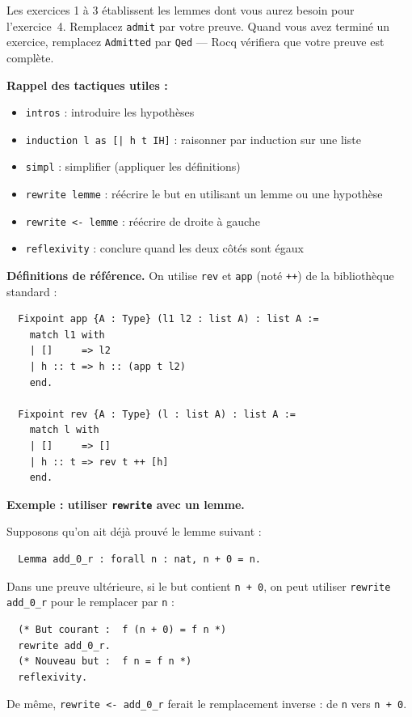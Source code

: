 \documentclass[11pt,a4paper]{article}
\newenvironment{rappel}{
\begin{mdframed}[style=rappelstyle]}{
\end{mdframed}}
\newcommand{\cq}[1]{\texttt{#1}}
\begin{document}
Les exercices 1 à 3 établissent les lemmes dont vous aurez besoin pour
l'exercice~4. Remplacez \cq{admit} par votre preuve. Quand vous avez terminé
un exercice, remplacez \cq{Admitted} par \cq{Qed} --- Rocq vérifiera que
votre preuve est complète.

\begin{rappel}
  \textbf{Rappel des tactiques utiles :}
  \begin{itemize}[noitemsep,topsep=2pt]
    \item \cq{intros} : introduire les hypothèses
    \item \cq{induction l as [| h t IH]} : raisonner par induction sur une liste
    \item \cq{simpl} : simplifier (appliquer les définitions)
    \item \cq{rewrite lemme} : réécrire le but en utilisant un lemme ou une hypothèse
    \item \cq{rewrite <- lemme} : réécrire de droite à gauche
    \item \cq{reflexivity} : conclure quand les deux côtés sont égaux
  \end{itemize}

\end{rappel}

\begin{rappel}
  \textbf{Définitions de référence.} On utilise \cq{rev} et \cq{app} (noté \cq{++})
  de la bibliothèque standard :
\begin{verbatim}
  Fixpoint app {A : Type} (l1 l2 : list A) : list A :=
    match l1 with
    | []     => l2
    | h :: t => h :: (app t l2)
    end.

  Fixpoint rev {A : Type} (l : list A) : list A :=
    match l with
    | []     => []
    | h :: t => rev t ++ [h]
    end.
\end{verbatim}
\end{rappel}

\begin{rappel}
  \textbf{Exemple : utiliser \cq{rewrite} avec un lemme.}

  Supposons qu'on ait déjà prouvé le lemme suivant :
\begin{verbatim}
  Lemma add_0_r : forall n : nat, n + 0 = n.
\end{verbatim}
  Dans une preuve ultérieure, si le but contient \cq{n + 0}, on peut utiliser
  \cq{rewrite add_0_r} pour le remplacer par \cq{n} :
\begin{verbatim}
  (* But courant :  f (n + 0) = f n *)
  rewrite add_0_r.
  (* Nouveau but :  f n = f n *)
  reflexivity.
\end{verbatim}
  De même, \cq{rewrite <- add_0_r} ferait le remplacement inverse :
  de \cq{n} vers \cq{n + 0}.

\end{rappel}
\end{document}
